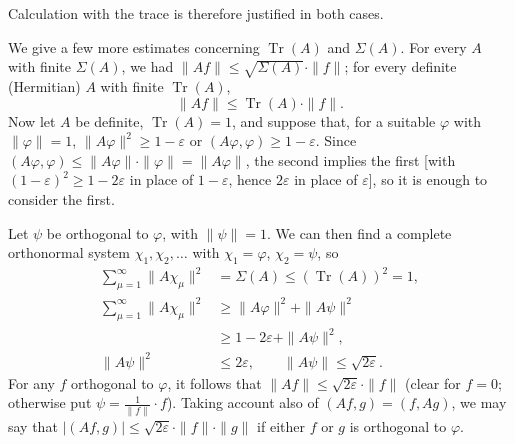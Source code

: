 \documentclass[fontsize=13pt,twoside,openany,headings=normal,parskip=false,bookmarkpackage=false,DIV=calc]{scrbook}
\begin{document}
Calculation with the trace is therefore justified in both cases.

We give a few more estimates concerning $\operatorname{Tr}(A)$ and $\Sigma(A)$. For every $A$ with finite $\Sigma(A)$, we had $\|Af\|\leq\sqrt{\Sigma(A)}\cdot\|f\|$; for every definite (Hermitian) $A$ with finite $\operatorname{Tr}(A)$,
\[
\|Af\|\leq\operatorname{Tr}(A)\cdot\|f\|.
\]
Now let $A$ be definite, $\operatorname{Tr}(A)=1$, and suppose that, for a suitable $\varphi$ with $\|\varphi\|=1$, $\|A\varphi\|^2\geq1-\varepsilon$ or $(A\varphi,\varphi)\geq1-\varepsilon$. Since $(A\varphi,\varphi)\leq\|A\varphi\|\cdot\|\varphi\|=\|A\varphi\|$, the second implies the first [with $(1-\varepsilon)^2\geq1-2\varepsilon$ in place of $1-\varepsilon$, hence $2\varepsilon$ in place of $\varepsilon$], so it is enough to consider the first.

Let $\psi$ be orthogonal to $\varphi$, with $\|\psi\|=1$. We can then find a complete orthonormal system $\chi_1,\chi_2,\ldots$ with $\chi_1=\varphi$, $\chi_2=\psi$, so
\begin{align*}
\sum_{\mu=1}^{\infty}\|A\chi_\mu\|^2
&=\Sigma(A)\leq(\operatorname{Tr}(A))^2=1,\\
\sum_{\mu=1}^{\infty}\|A\chi_\mu\|^2
&\geq\|A\varphi\|^2+\|A\psi\|^2\\
&\geq1-2\varepsilon+\|A\psi\|^2,\\
\|A\psi\|^2&\leq2\varepsilon,\qquad\|A\psi\|\leq\sqrt{2\varepsilon}.
\end{align*}
For any $f$ orthogonal to $\varphi$, it follows that $\|Af\|\leq\sqrt{2\varepsilon}\cdot\|f\|$ (clear for $f=0$; otherwise put $\psi=\frac1{\|f\|}\cdot f$). Taking account also of $(Af,g)=(f,Ag)$, we may say that $|(Af,g)|\leq\sqrt{2\varepsilon}\cdot\|f\|\cdot\|g\|$ if either $f$ or $g$ is orthogonal to $\varphi$.
\end{document}

